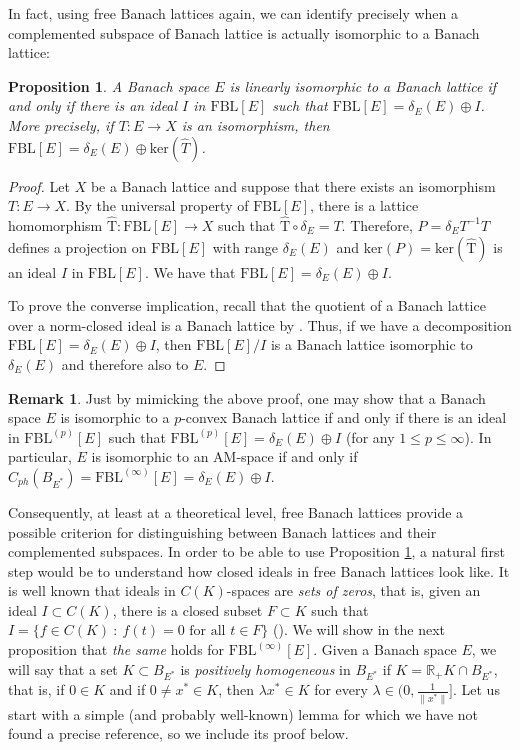 \documentclass[11pt]{amsart}
\newtheorem{prop}[thm]{Proposition}
\theoremstyle{definition}
\newtheorem{rem}[thm]{Remark}
\numberwithin{equation}{section}
\newcommand{\fbl}{\text{FBL}}
\begin{document}
In fact, using free Banach lattices again, we can identify precisely when a complemented subspace of Banach lattice is actually isomorphic to a Banach lattice:

\begin{prop}\label{prop:characterization-isomorphic-Banach-lattices}
A Banach space $E$ is linearly isomorphic to a Banach lattice if and only if there is an ideal $I$ in $\fbl[E]$ such that $\fbl[E]=\delta_E(E)\oplus I$. More precisely, if $T:E\to X$ is an isomorphism, then $\fbl[E]=\delta_E(E)\oplus \text{ker}(\widehat{T})$.
\end{prop}
\begin{proof}
Let $X$ be a Banach lattice and suppose that there exists an isomorphism $T:E\to X$. By the universal property of $\fbl[E]$, there is a lattice homomorphism $\widehat{\text{T}}:\fbl[E]\to X$ such that $\widehat{\text{T}}\circ \delta_{E}=T$. Therefore, $P=\delta_{E}T^{-1} \widehat{T}$ defines a projection on $\fbl[E]$ with range $\delta_{E}(E)$ and $\text{ker}(P)=\text{ker}(\widehat{\text{T}})$ is an ideal $I$ in $\fbl[E]$. We have that $\fbl[E]=\delta_{E}(E)\oplus I$.

To prove the converse implication, recall that the quotient of a Banach lattice over a norm-closed ideal is a Banach lattice by \cite[Corollary 1.3.14]{M-N-book}. Thus, if we have a decomposition $\fbl[E]=\delta_E(E)\oplus I$, then $\fbl[E]/I$ is a Banach lattice isomorphic to $\delta_E(E)$ and therefore also to $E$.
\end{proof}

\begin{rem}
    Just by mimicking the above proof, one may show that a Banach space $E$ is isomorphic to a $p$-convex Banach lattice if and only if there is an ideal in $\fbl^{(p)}[E]$ such that $\fbl^{(p)}[E]=\delta_E(E)\oplus I$ (for any $1\leq p\leq \infty$). In particular, $E$ is isomorphic to an AM-space if and only if $C_{ph}(B_{E^*})=\fbl^{(\infty)}[E]=\delta_E(E)\oplus I$. 
\end{rem}

Consequently, at least at a theoretical level, free Banach lattices provide a possible criterion for distinguishing between Banach lattices and their complemented subspaces. In order to be able to use Proposition \ref{prop:characterization-isomorphic-Banach-lattices}, a natural first step would be to understand how closed ideals in free Banach lattices look like. It is well known that ideals in $C(K)$-spaces are \textit{sets of zeros}, that is, given an ideal $I\subset C(K)$, there is a closed subset $F\subset K$ such that $I=\{f\in C(K)\::\: f(t)=0 \text{ for all } t\in F\}$ (\cite[Proposition 2.1.9]{M-N-book}). We will show in the next proposition that \textit{the same} holds for $\fbl^{(\infty)}[E]$. Given a Banach space $E$, we will say that a set $K\subset B_{E^*}$ is \textit{positively homogeneous} in $B_{E^*}$ if $K=\mathbb{R}_+ K \cap B_{E^*}$, that is, if $0\in K$ and if $0\neq x^*\in K$, then $\lambda x^*\in K$ for every $\lambda\in \bigl(0,\frac{1}{\|x^*\|}\bigr]$. Let us start with a simple (and probably well-known) lemma for which we have not found a precise reference, so we include its proof below.
\end{document}
